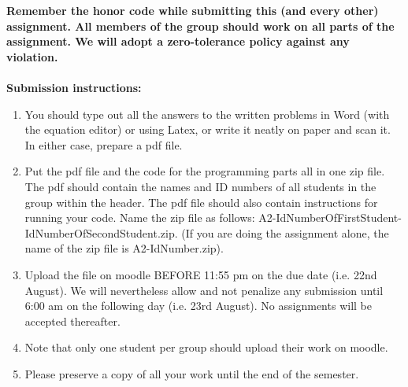\documentclass[11pt]{article}
\begin{document}
\maketitle

\textbf{Remember the honor code while submitting this (and every other) assignment. All members of the group should work on all parts of the assignment. We will adopt a \textbf{zero-tolerance policy} against any violation.}
\\
\\
\textbf{Submission instructions:} 
\begin{enumerate}
\item You should type out all the answers to the written problems in Word (with the equation editor) or using Latex, or write it neatly on paper and scan it. In either case, prepare a pdf file. 
\item Put the pdf file and the code for the programming parts all in one zip file. The pdf should contain the names and ID numbers of all students in the group within the header. The pdf file should also contain instructions for running your code. Name the zip file as follows: A2-IdNumberOfFirstStudent-IdNumberOfSecondStudent.zip. (If you are doing the assignment alone, the name of the zip file is A2-IdNumber.zip). 
\item Upload the file on moodle BEFORE 11:55 pm on the due date (i.e. 22nd August). We will nevertheless allow and not penalize any submission until 6:00 am on the following day (i.e. 23rd August). No assignments will be accepted thereafter. 
\item Note that only one student per group should upload their work on moodle. 
\item Please preserve a copy of all your work until the end of the semester. 
\end{enumerate}
\end{document}
